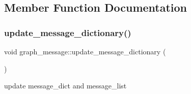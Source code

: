 \subsection{Member Function Documentation}
\mbox{\label{classgraph__message_aede1ecdcf72bac693d357241eddb20b0}} 
\subsubsection{\texorpdfstring{update\+\_\+message\+\_\+dictionary()}{update\_message\_dictionary()}}
{\footnotesize\ttfamily void graph\+\_\+message\+::update\+\_\+message\+\_\+dictionary (\begin{DoxyParamCaption}{ }\end{DoxyParamCaption})}



update message\+\_\+dict and message\+\_\+list 

